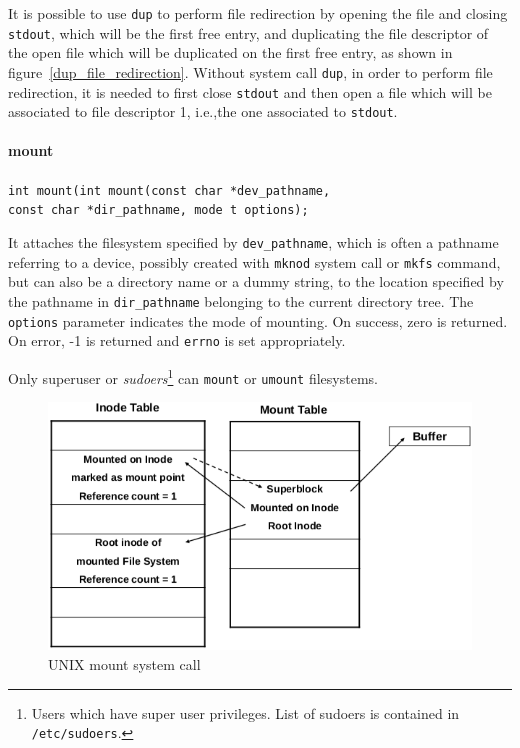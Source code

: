 It is possible to use \texttt{dup} to perform file redirection by opening the file and closing \texttt{stdout}, which will be the first free entry, and duplicating the file descriptor of the open file which will be duplicated on the first free entry, as shown in figure~\ref{dup_file_redirection}. Without system call \texttt{dup}, in order to perform file redirection, it is needed to first close \texttt{stdout} and then open a file which will be associated to file descriptor 1, i.e.,\@ the one associated to \texttt{stdout}.

\paragraph{mount}
\texttt{int mount(int mount(const char *dev\_pathname, \\ const char *dir\_pathname, mode t options);}

It attaches the filesystem specified by \texttt{dev\_pathname}, which is often a pathname referring to a device, possibly created with \texttt{mknod} system call or \texttt{mkfs} command, but can also be a directory name or a dummy string, to the location specified by the pathname in \texttt{dir\_pathname} belonging to the current directory tree. The \texttt{options} parameter indicates the mode of mounting. On success, zero is
returned. On error, -1 is returned and
\texttt{errno} is set appropriately.

Only superuser or \emph{sudoers}\footnote{Users which have super user privileges. List of sudoers is contained in \texttt{/etc/sudoers}.} can \texttt{mount} or \texttt{umount} filesystems.

\begin{figure}[hbtp]
\centering
\includegraphics[scale=0.35]{images/file_system/mount.png}
\caption{UNIX mount system call}
\end{figure}

